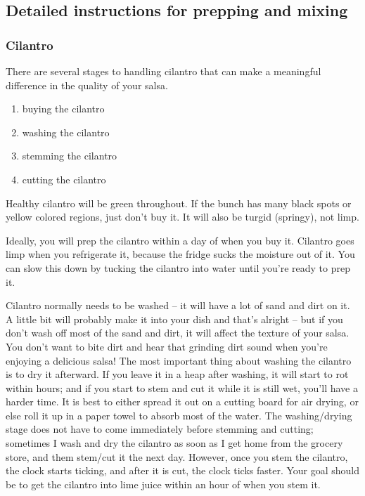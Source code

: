 \subsection{Detailed instructions for prepping and mixing}

\subsubsection{Cilantro}

There are several stages to handling cilantro that can make a meaningful difference in the quality of your salsa. \begin{enumerate}
    \item buying the cilantro
    \item washing the cilantro
    \item stemming the cilantro
    \item cutting the cilantro
\end{enumerate}
Healthy cilantro will be green throughout. If the bunch has many black spots or yellow colored regions, just don't buy it. It will also be turgid (springy), not limp.

Ideally, you will prep the cilantro within a day of when you buy it. Cilantro goes limp when you refrigerate it, because the fridge sucks the moisture out of it. You can slow this down by tucking the cilantro into water until you're ready to prep it.

Cilantro normally needs to be washed -- it will have a lot of sand and dirt on it. A little bit will probably make it into your dish and that's alright -- but if you don't wash off most of the sand and dirt, it will affect the texture of your salsa. You don't want to bite dirt and hear that grinding dirt sound when you're enjoying a delicious salsa! The most important thing about washing the cilantro is to dry it afterward. If you leave it in a heap after washing, it will start to rot within hours; and if you start to stem and cut it while it is still wet, you'll have a harder time. It is best to either spread it out on a cutting board for air drying, or else roll it up in a paper towel to absorb most of the water. The washing/drying stage does not have to come immediately before stemming and cutting; sometimes I wash and dry the cilantro as soon as I get home from the grocery store, and them stem/cut it the next day. However, once you stem the cilantro, the clock starts ticking, and after it is cut, the clock ticks faster. Your goal should be to get the cilantro into lime juice within an hour of when you stem it.


